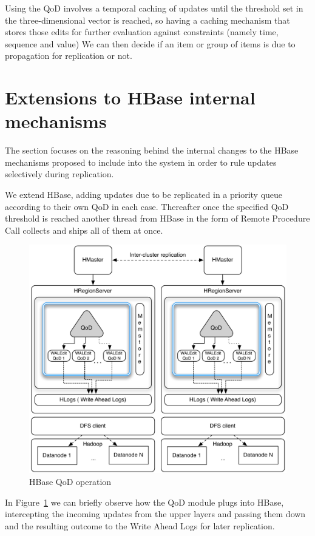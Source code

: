 Using the QoD involves a temporal caching of updates until the threshold set in the three-dimensional vector is reached, so having a caching mechanism that stores those edits for further evaluation against constraints (namely time, sequence and value) We can then decide if an item or group of items is due to propagation for replication or not.

\section{Extensions to HBase internal mechanisms}\label{architecture:extensions}
The section focuses on the reasoning behind the internal changes to the HBase mechanisms proposed to include into the system in order to rule updates selectively during replication.

We extend HBase, adding updates due to be replicated in a priority queue according to their own QoD in each case. Thereafter once the specified QoD threshold is reached another thread from HBase in the form of Remote Procedure Call collects and ships all of them at once.

\begin{figure}[t]
\centering
\includegraphics[width=0.8\linewidth]{figs/multi-site.pdf}
\caption{HBase QoD operation}
\label{fig-qod-module}
\end{figure}

In Figure~\ref{fig-qod-module} we can briefly observe how the QoD module plugs into HBase, intercepting the incoming updates from the upper layers and passing them down and the resulting outcome to the Write Ahead Logs for later replication.

